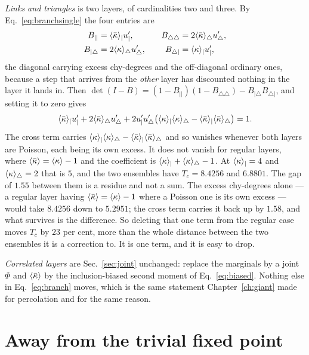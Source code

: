 \emph{Links and triangles} is two layers, of cardinalities two and three. By
Eq.~\eqref{eq:branchsingle} the four entries are
\[
  \begin{aligned}
    B_{||}&=\langle \bar\kappa \rangle_{|}u'_{|}, &\quad
    B_{\triangle\triangle}&=2\langle \bar\kappa \rangle_{\triangle}u'_{\triangle},\\
    B_{|\triangle}&=2\langle \kappa \rangle_{\triangle}u'_{\triangle}, &\quad
    B_{\triangle|}&=\langle \kappa \rangle_{|}u'_{|},
  \end{aligned}
\]
the diagonal carrying excess chy-degrees and the off-diagonal ordinary ones,
because a step that arrives from the \emph{other} layer has discounted nothing
in the layer it lands in. Then
$\det(I-B)=(1-B_{||})(1-B_{\triangle\triangle})-B_{|\triangle}B_{\triangle|}$,
and setting it to zero gives
\begin{equation}
  \langle \bar\kappa \rangle_{|}u'_{|}+2\langle \bar\kappa \rangle_{\triangle}u'_{\triangle}
  +2u'_{|}u'_{\triangle}\bigl(\langle \kappa \rangle_{|}\langle \kappa \rangle_{\triangle}
    -\langle \bar\kappa \rangle_{|}\langle \bar\kappa \rangle_{\triangle}\bigr)=1.
  \label{eq:LT}
\end{equation}
The cross term carries
$\langle \kappa \rangle_{|}\langle \kappa \rangle_{\triangle}-\langle \bar\kappa \rangle_{|}\langle \bar\kappa \rangle_{\triangle}$
and so vanishes whenever both layers are Poisson, each being its own excess. It
does not vanish for regular layers, where $\langle \bar\kappa \rangle=\langle \kappa \rangle-1$ and the
coefficient is $\langle \kappa \rangle_{|}+\langle \kappa \rangle_{\triangle}-1$. At
$\langle \kappa \rangle_{|}=4$ and $\langle \kappa \rangle_{\triangle}=2$ that is $5$, and the two
ensembles have $T_{c}=8.4256$ and $6.8801$. The gap of $1.55$ between them is a
residue and not a sum. The excess chy-degrees alone --- a regular layer having
$\langle \bar\kappa \rangle=\langle \kappa \rangle-1$ where a Poisson one is its own excess --- would
take $8.4256$ down to $5.2951$; the cross term carries it back up by $1.58$, and
what survives is the difference. So deleting that one term from the regular case
moves $T_{c}$ by $23$ per cent, more than the whole distance between the two
ensembles it is a correction to. It is one term, and it is easy to drop.

\emph{Correlated layers} are Sec.~\ref{sec:joint} unchanged: replace the
marginals by a joint $\Phi$ and $\langle \bar\kappa \rangle$ by the inclusion-biased second
moment of Eq.~\eqref{eq:biased}. Nothing else in Eq.~\eqref{eq:branch} moves,
which is the same statement Chapter~\ref{ch:giant} made for percolation and for
the same reason.

\section{Away from the trivial fixed point}
\label{sec:fixedpoint}

